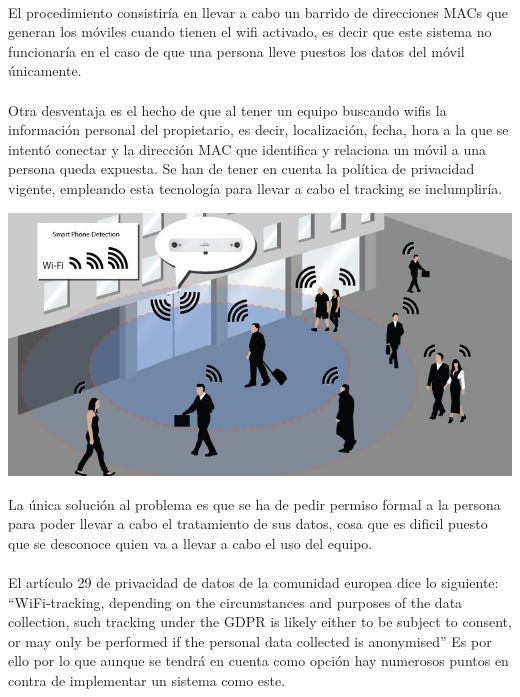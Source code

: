 \documentclass[a4paper ,12pt, onecolumn]{article}
\begin{document}
            \paragraph{}
            El procedimiento consistiría en llevar a cabo un barrido de direcciones MACs que generan los móviles cuando tienen el wifi activado,
            es decir que este sistema no funcionaría en el caso de que una persona lleve puestos los datos del móvil únicamente.
            \paragraph{}
            Otra desventaja es el hecho de que al tener un equipo buscando wifis la información personal del propietario, es decir, localización,
            fecha, hora a la que se intentó conectar y la dirección MAC que identifica y relaciona un móvil a una persona queda expuesta.
            Se han de tener en cuenta la política de privacidad vigente, empleando esta tecnología para llevar a cabo el tracking se inclumpliría.
            \begin{center}
                \includegraphics[scale=0.3]{WifiCounting.jpg}
            \end{center}
            La única solución al problema es que se ha de pedir permiso formal a la persona para poder llevar a cabo
            el tratamiento de sus datos, cosa que es dificil puesto que se desconoce quien va a llevar a cabo el uso del equipo.
            \paragraph{}
            El artículo 29 de privacidad de datos de la comunidad europea dice lo siguiente:
            “WiFi-tracking, depending on the circumstances and purposes of the data collection, such tracking under the GDPR is likely
            either to be subject to consent, or may only be performed if the personal data collected is anonymised”
            Es por ello por lo que aunque se tendrá en cuenta como opción hay numerosos puntos en contra de implementar un sistema como este.
\end{document}
